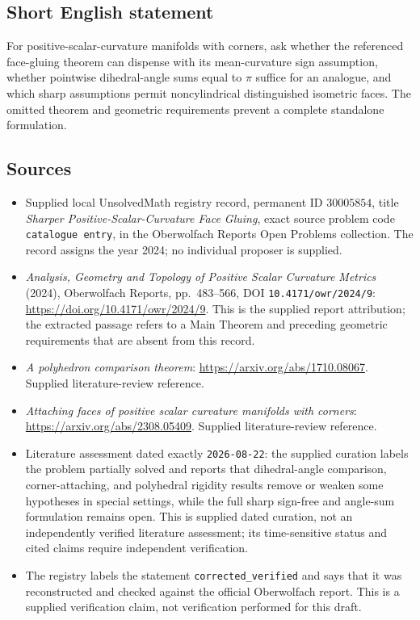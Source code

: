 \documentclass[11pt]{article}
\begin{document}
\subsection{Short English statement}
For positive-scalar-curvature manifolds with corners, ask whether the referenced face-gluing theorem can dispense with its mean-curvature sign assumption, whether pointwise dihedral-angle sums equal to \(\pi\) suffice for an analogue, and which sharp assumptions permit noncylindrical distinguished isometric faces. The omitted theorem and geometric requirements prevent a complete standalone formulation.
\subsection{Sources}
\begin{itemize}
\item Supplied local UnsolvedMath registry record, permanent ID \(30005854\), title \emph{Sharper Positive-Scalar-Curvature Face Gluing}, exact source problem code \texttt{catalogue entry}, in the Oberwolfach Reports Open Problems collection. The record assigns the year 2024; no individual proposer is supplied.
\item \emph{Analysis, Geometry and Topology of Positive Scalar Curvature Metrics} (2024), Oberwolfach Reports, pp.\ 483--566, DOI \texttt{10.4171/owr/2024/9}: \url{https://doi.org/10.4171/owr/2024/9}. This is the supplied report attribution; the extracted passage refers to a Main Theorem and preceding geometric requirements that are absent from this record.
\item \emph{A polyhedron comparison theorem}: \url{https://arxiv.org/abs/1710.08067}. Supplied literature-review reference.
\item \emph{Attaching faces of positive scalar curvature manifolds with corners}: \url{https://arxiv.org/abs/2308.05409}. Supplied literature-review reference.
\item Literature assessment dated exactly \texttt{2026-08-22}: the supplied curation labels the problem partially solved and reports that dihedral-angle comparison, corner-attaching, and polyhedral rigidity results remove or weaken some hypotheses in special settings, while the full sharp sign-free and angle-sum formulation remains open. This is supplied dated curation, not an independently verified literature assessment; its time-sensitive status and cited claims require independent verification.
\item The registry labels the statement \texttt{corrected\_verified} and says that it was reconstructed and checked against the official Oberwolfach report. This is a supplied verification claim, not verification performed for this draft.
\end{itemize}
\end{document}

